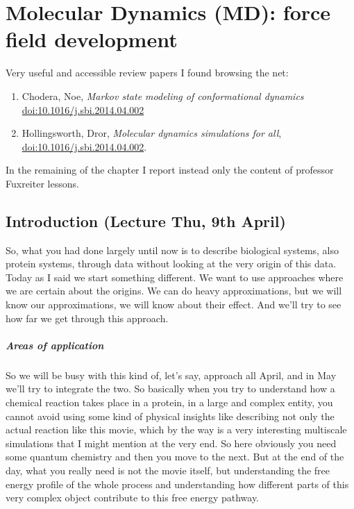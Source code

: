 \chapter{Molecular Dynamics (MD): force field development}


Very useful and accessible review papers I found browsing the net:
\begin{enumerate}
    \item Chodera, Noe, \textit{Markov state modeling of conformational dynamics} \url{doi:10.1016/j.sbi.2014.04.002}
    \item Hollingsworth, Dror, \textit{Molecular dynamics simulations for all}, \url{doi:10.1016/j.sbi.2014.04.002}.
\end{enumerate}

In the remaining of the chapter I report instead only the content of professor Fuxreiter lessons.
\section{Introduction (Lecture Thu, 9th April)}

So, what you had done largely until now is to describe biological systems, also protein systems, through data without looking at the very origin of this data. 
Today as I said we start something different. We want to use approaches where we are certain about the origins. We can do heavy approximations, but we will know our approximations, we will know about their effect. And we'll try to see how far we get through this approach. 

\paragraph{Areas of application}
So we will be busy with this kind of, let's say, approach all April, and in May we'll try to integrate the two. So basically when you try to understand how a chemical reaction takes place in a protein, in a large and complex entity, you cannot avoid using some kind of physical insights like describing not only the actual reaction like this movie, which by the way is a very interesting multiscale simulations that I might mention at the very end. So here obviously you need some quantum chemistry and then you move to the next. But at the end of the day, what you really need is not the movie itself, but understanding the free energy profile of the whole process and understanding how different parts of this very complex object contribute to this free energy pathway. 

